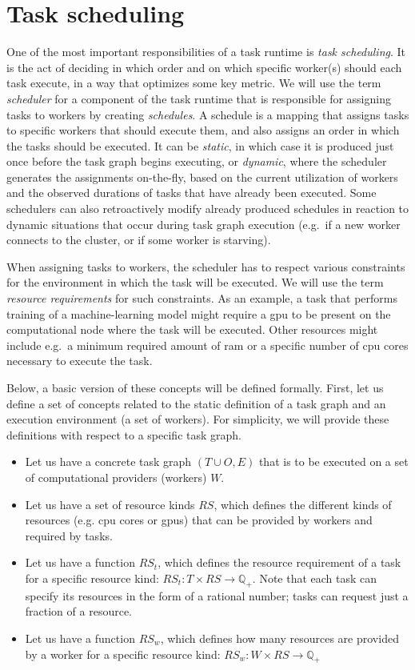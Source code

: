 \section{Task scheduling}
One of the most important responsibilities of a task runtime is \emph{task scheduling}. It is the
act of deciding in which order and on which specific worker(s) should each task execute, in a way
that optimizes some key metric. We will use the term \emph{scheduler} for a component of the
task runtime that is responsible for assigning tasks to workers by creating \emph{schedules}.
A schedule is a mapping that assigns tasks to specific workers that should execute them, and also
assigns an order in which the tasks should be executed. It can be \emph{static}, in which
case it is produced just once before the task graph begins executing, or \emph{dynamic},
where the scheduler generates the assignments on-the-fly, based on the current utilization of
workers and the observed durations of tasks that have already been executed. Some schedulers can
also retroactively modify already produced schedules in reaction to dynamic situations that occur
during task graph execution (e.g.\ if a new worker connects to the cluster, or if some worker is
starving).

When assigning tasks to workers, the scheduler has to respect various constraints for the
environment in which the task will be executed. We will use the term \emph{resource requirements} for
such constraints. As an example, a task that performs training of a machine-learning model might
require a \gls{gpu} to be present on the computational node where the task will be
executed. Other resources might include e.g.\ a minimum required amount of \gls{ram}
or a specific number of \gls{cpu} cores necessary to execute the task.

Below, a basic version of these concepts will be defined formally. First, let us define a set of
concepts related to the static definition of a task graph and an execution environment (a set of
workers). For simplicity, we will provide these definitions with respect to a specific task graph.

\begin{itemize}
	\item Let us have a concrete task graph $(T \cup O, E)$ that is to be executed on a set of
	      computational providers (workers) $W$.
	\item Let us have a set of resource kinds $RS$, which defines the different kinds of
	      resources (e.g. \gls{cpu} cores or \glspl{gpu}) that can be provided by
	      workers and required by tasks.
	\item Let us have a function $RS_t$, which defines the resource requirement of a task for
	      a specific resource kind: $RS_t\colon T \times RS \rightarrow \mathbb{Q_{+}}$. Note that each task can specify its resources in
	      the form of a rational number; tasks can request just a fraction of a resource.
	\item Let us have a function $RS_w$, which defines how many resources are provided by a
	      worker for a specific resource kind: $RS_w\colon W \times RS \rightarrow \mathbb{Q_{+}}$
\end{itemize}

